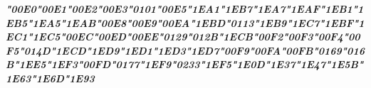 {\LibertinusSerifPatch\itshape\bfseries 
	\char"00E0\gs \char"00E1\gs \char"00E2\gs \char"00E3\gs \char"0101\gs \char"00E5\gs \char"1EA1\gs \char"1EB7\gs \char"1EA7\gs \char"1EAF\gs \char"1EB1\gs \char"1EB5\gs \char"1EA5\gs \char"1EAB\gs \char"00E8\gs \char"00E9\gs \char"00EA\gs \char"1EBD\gs \char"0113\gs \char"1EB9\gs \char"1EC7\gs \char"1EBF\gs \char"1EC1\gs \char"1EC5\gs \char"00EC\gs \char"00ED\gs \char"00EE\gs \char"0129\gs \char"012B\gs \char"1ECB\gs \char"00F2\gs \char"00F3\gs \char"00F4\gs \char"00F5\gs \char"014D\gs \char"1ECD\gs \char"1ED9\gs \char"1ED1\gs \char"1ED3\gs \char"1ED7\gs \char"00F9\gs \char"00FA\gs \char"00FB\gs \char"0169\gs \char"016B\gs \char"1EE5\gs \char"1EF3\gs \char"00FD\gs \char"0177\gs \char"1EF9\gs \char"0233\gs \char"1EF5\gs \char"1E0D\gs \char"1E37\gs \char"1E47\gs \char"1E5B\gs \char"1E63\gs \char"1E6D\gs \char"1E93\gs
}

